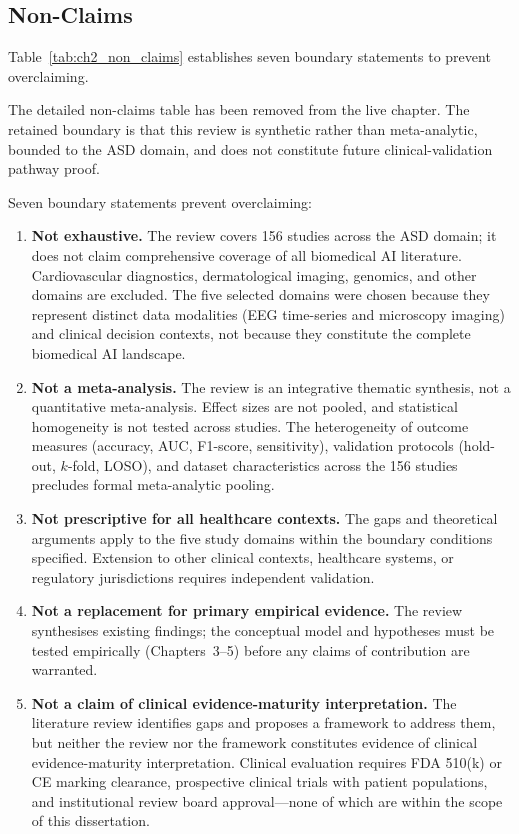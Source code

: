 \subsection{Non-Claims}

Table~\ref{tab:ch2_non_claims} establishes seven boundary statements to prevent overclaiming.

\noindent The detailed non-claims table has been removed from the live chapter. The retained boundary is that this review is synthetic rather than meta-analytic, bounded to the ASD domain, and does not constitute future clinical-validation pathway proof.

\iffalse %
Seven boundary statements prevent overclaiming:

\begin{enumerate}
    \item \textbf{Not exhaustive.} The review covers 156 studies across the ASD domain; it does not claim comprehensive coverage of all biomedical AI literature. Cardiovascular diagnostics, dermatological imaging, genomics, and other domains are excluded. The five selected domains were chosen because they represent distinct data modalities (EEG time-series and microscopy imaging) and clinical decision contexts, not because they constitute the complete biomedical AI landscape.
    \item \textbf{Not a meta-analysis.} The review is an integrative thematic synthesis, not a quantitative meta-analysis. Effect sizes are not pooled, and statistical homogeneity is not tested across studies. The heterogeneity of outcome measures (accuracy, AUC, F1-score, sensitivity), validation protocols (hold-out, $k$-fold, LOSO), and dataset characteristics across the 156 studies precludes formal meta-analytic pooling.
    \item \textbf{Not prescriptive for all healthcare contexts.} The gaps and theoretical arguments apply to the five study domains within the boundary conditions specified. Extension to other clinical contexts, healthcare systems, or regulatory jurisdictions requires independent validation.
    \item \textbf{Not a replacement for primary empirical evidence.} The review synthesises existing findings; the conceptual model and hypotheses must be tested empirically (Chapters~3--5) before any claims of contribution are warranted.
    \item \textbf{Not a claim of clinical evidence-maturity interpretation.} The literature review identifies gaps and proposes a framework to address them, but neither the review nor the framework constitutes evidence of clinical evidence-maturity interpretation. Clinical evaluation requires FDA 510(k) or CE marking clearance, prospective clinical trials with patient populations, and institutional review board approval---none of which are within the scope of this dissertation.

\end{enumerate}

